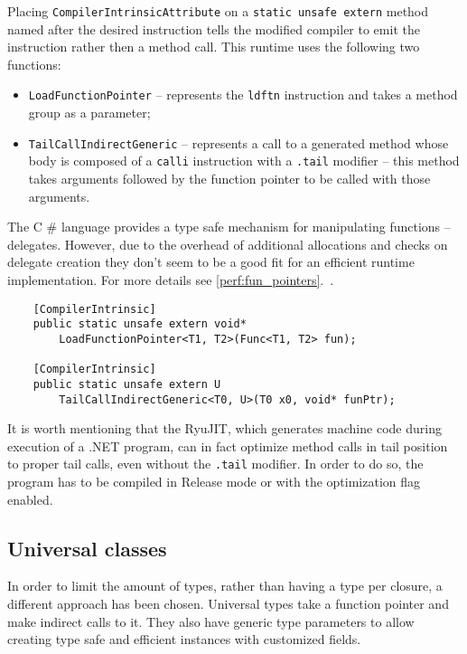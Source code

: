 \documentclass[en]{pracamgr}
\newcommand{\shrp}{%
  {\fontfamily{ppl}\selectfont\#%
  }}
\newcommand{\myref}[1]{\ref{#1}.~\textit{\nameref{#1}}}
\begin{document}
Placing \texttt{CompilerIntrinsicAttribute} on a 
\texttt{static unsafe extern} method named after
the desired instruction tells the modified compiler to emit the
instruction rather then a method call.
This runtime uses the following two functions:

\begin{itemize}
    \item \texttt{LoadFunctionPointer} -- represents the 
    \texttt{ldftn} instruction and takes a method group as a parameter;
    \item \texttt{TailCallIndirectGeneric} -- represents a 
    call to a generated method whose body is composed of a \texttt{calli} 
    instruction with a \texttt{.tail} modifier --
    this method takes arguments followed by the function pointer
    to be called with those arguments.
\end{itemize}

The C\shrp{} language provides a type safe mechanism for manipulating
functions -- delegates. However, due to the overhead of
additional allocations and checks on delegate creation they
don't seem to be a good fit for an efficient runtime implementation. For more details see \myref{perf:fun_pointers}.

\begin{verbatim}
    [CompilerIntrinsic]
    public static unsafe extern void*
        LoadFunctionPointer<T1, T2>(Func<T1, T2> fun);

    [CompilerIntrinsic]
    public static unsafe extern U
        TailCallIndirectGeneric<T0, U>(T0 x0, void* funPtr);
\end{verbatim}

It is worth mentioning that the RyuJIT, which generates
machine code during execution of a .NET program,
can in fact optimize method calls in tail position
to proper tail calls, even without the \texttt{.tail}
modifier. In order to do so, the program has to be compiled
in Release mode or with the optimization flag enabled.

\subsection{Universal classes}

In order to limit the amount of types, rather than having
a type per closure, a different approach has been chosen.
Universal types take a function pointer and make
indirect calls to it.
They also have generic type parameters to allow creating
type safe and efficient instances with customized fields.
\end{document}
